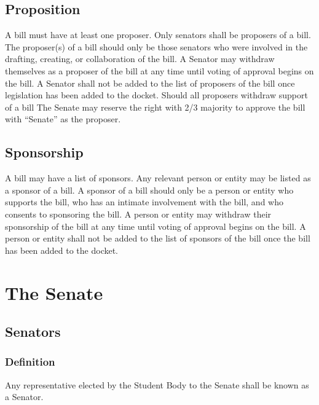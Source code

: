 \documentclass[12pt]{scrreprt}
\begin{document}
\section{Proposition}
A bill must have at least one proposer. Only senators shall be proposers of a bill. The proposer(s) of a bill should only be those senators who were involved in the drafting, creating, or collaboration of the bill. A Senator may withdraw themselves as a proposer of the bill at any time until voting of approval begins on the bill. A Senator shall not be added to the list of proposers of the bill once legislation has been added to the docket. Should all proposers withdraw support of a bill The Senate may reserve the right with 2/3 majority to approve the bill with “Senate” as the proposer.

\section{Sponsorship}
A bill may have a list of sponsors. Any relevant person or entity may be listed as a sponsor of a bill. A sponsor of a bill should only be a person or entity who supports the bill, who has an intimate involvement with the bill, and who consents to sponsoring the bill. A person or entity may withdraw their sponsorship of the bill at any time until voting of approval begins on the bill. A person or entity shall not be added to the list of sponsors of the bill once the bill has been added to the docket.


\chapter{The Senate}

\section{Senators}
\subsection{Definition}
Any representative elected by the Student Body to the Senate shall be known as a Senator.
\end{document}
